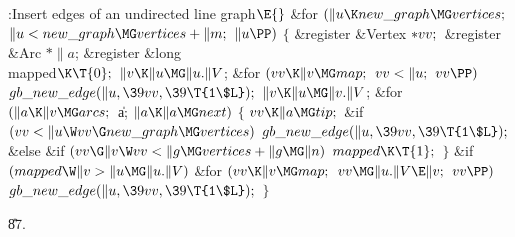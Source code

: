 \Y\B\4:Insert edges of an undirected line graph\X${}\E{}$\6
\&{for} ${}(\|u\K\\{new\_graph}\MG\\{vertices};{}$ ${}\|u<\\{new\_graph}\MG%
\\{vertices}+\|m;{}$ ${}\|u\PP){}$\5
${}\{{}$\5
\1\&{register} \&{Vertex} ${}{*}\\{vv};{}$\6
\&{register} \&{Arc} ${}{*}\|a{}$;\5
\&{register} \&{long} \\{mapped}${}\K\T{0};{}$\7
${}\|v\K\|u\MG\|u.\|V{}$;\6
\&{for} ${}(\\{vv}\K\|v\MG\\{map};{}$ ${}\\{vv}<\|u;{}$ ${}\\{vv}\PP){}$\1\5
${}\\{gb\_new\_edge}(\|u,\39\\{vv},\39\T{1\$L});{}$\2\6
${}\|v\K\|u\MG\|v.\|V{}$;\6
\&{for} ${}(\|a\K\|v\MG\\{arcs};{}$ \|a; ${}\|a\K\|a\MG\\{next}){}$\5
${}\{{}$\1\6
${}\\{vv}\K\|a\MG\\{tip};{}$\6
\&{if} ${}(\\{vv}<\|u\W\\{vv}\G\\{new\_graph}\MG\\{vertices}){}$\1\5
${}\\{gb\_new\_edge}(\|u,\39\\{vv},\39\T{1\$L});{}$\2\6
\&{else} \&{if} ${}(\\{vv}\G\|v\W\\{vv}<\|g\MG\\{vertices}+\|g\MG\|n){}$\1\5
${}\\{mapped}\K\T{1};{}$\2\6
\4${}\}{}$\2\6
\&{if} ${}(\\{mapped}\W\|v>\|u\MG\|u.\|V){}$\1\6
\&{for} ${}(\\{vv}\K\|v\MG\\{map};{}$ ${}\\{vv}\MG\|u.\|V\E\|v;{}$ ${}\\{vv}%
\PP){}$\1\5
${}\\{gb\_new\_edge}(\|u,\39\\{vv},\39\T{1\$L});{}$\2\2\6
\4${}\}{}$\2\par
\U87.\fi

